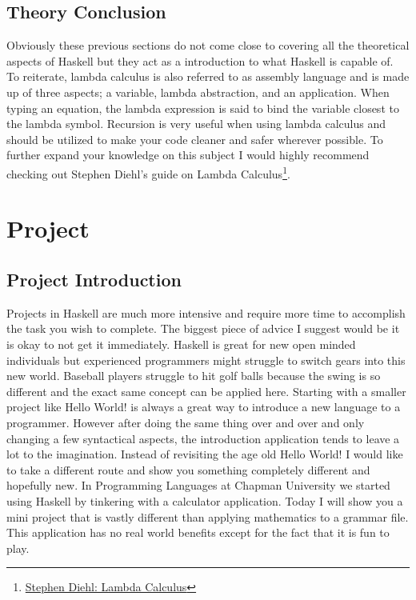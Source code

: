 \documentclass{article}
\begin{document}
\subsection{Theory Conclusion}
Obviously these previous sections do not come close to covering all the theoretical aspects of Haskell but they act as a introduction to what Haskell is capable of. To reiterate, lambda calculus is also referred to as assembly language and is made up of three aspects; a variable, lambda abstraction, and an application. When typing an equation, the lambda expression is said to bind the variable closest to the lambda symbol. Recursion is very useful when using lambda calculus and should be utilized to make your code cleaner and safer wherever possible. To further expand your knowledge on this subject I would highly recommend checking out Stephen Diehl's guide on Lambda Calculus\footnote{\href{http://dev.stephendiehl.com/fun/lambda_calculus.html}{Stephen Diehl: Lambda Calculus}}.
    

\section{Project}

    \subsection{Project Introduction}
    Projects in Haskell are much more intensive and require more time to accomplish the task you wish to complete. The biggest piece of advice I suggest would be it is okay to not get it immediately. Haskell is great for new open minded individuals but experienced programmers might struggle to switch gears into this new world. Baseball players struggle to hit golf balls because the swing is so different and the exact same concept can be applied here. Starting with a smaller project like Hello World! is always a great way to introduce a new language to a programmer. However after doing the same thing over and over and only changing a few syntactical aspects, the introduction application tends to leave a lot to the imagination. Instead of revisiting the age old Hello World! I would like to take a different route and show you something completely different and hopefully new. In Programming Languages at Chapman University we started using Haskell by tinkering with a calculator application. Today I will show you a mini project that is vastly different than applying mathematics to a grammar file. This application has no real world benefits except for the fact that it is fun to play. 
        
\end{document}
